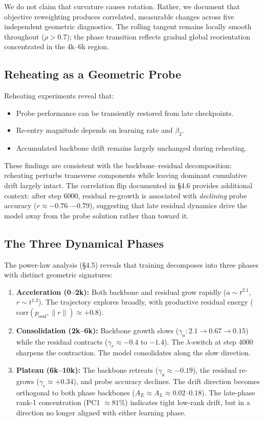 \documentclass[11pt,a4paper]{article}
\begin{document}
We do not claim that curvature causes rotation. Rather, we document that objective reweighting produces correlated, measurable changes across five independent geometric diagnostics. The rolling tangent remains locally smooth throughout ($\rho > 0.7$); the phase transition reflects gradual global reorientation concentrated in the 4k--6k region.


\subsection{Reheating as a Geometric Probe}

Reheating experiments reveal that:

\begin{itemize}
\item Probe performance can be transiently restored from late checkpoints.
\item Re-entry magnitude depends on learning rate and $\beta_2$.
\item Accumulated backbone drift remains largely unchanged during reheating.
\end{itemize}

These findings are consistent with the backbone--residual decomposition: reheating perturbs transverse components while leaving dominant cumulative drift largely intact. The correlation flip documented in \S4.6 provides additional context: after step 6000, residual re-growth is associated with \emph{declining} probe accuracy ($r \approx -0.76$--$-0.79$), suggesting that late residual dynamics drive the model away from the probe solution rather than toward it.


\subsection{The Three Dynamical Phases}

The power-law analysis (\S4.5) reveals that training decomposes into three phases with distinct geometric signatures:

\begin{enumerate}
\item \textbf{Acceleration (0--2k):} Both backbone and residual grow rapidly ($a \sim t^{2.1}$, $r \sim t^{1.2}$). The trajectory explores broadly, with productive residual energy ($\mathrm{corr}(p_{\mathrm{ood}}, \|r\|) \approx +0.8$).

\item \textbf{Consolidation (2k--6k):} Backbone growth slows ($\gamma_a: 2.1 \to 0.67 \to 0.15$) while the residual contracts ($\gamma_r \approx -0.4$ to $-1.4$). The $\lambda$-switch at step 4000 sharpens the contraction. The model consolidates along the slow direction.

\item \textbf{Plateau (6k--10k):} The backbone retreats ($\gamma_a \approx -0.19$), the residual re-grows ($\gamma_r \approx +0.34$), and probe accuracy declines. The drift direction becomes orthogonal to both phase backbones ($A_E \approx A_L \approx 0.02$--$0.18$). The late-phase rank-1 concentration (PC1 $\approx 81\%$) indicates tight low-rank drift, but in a direction no longer aligned with either learning phase.
\end{enumerate}
\end{document}
